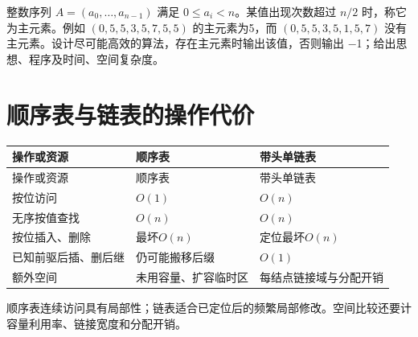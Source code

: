 整数序列 \(A=(a_0,\ldots,a_{n-1})\) 满足 \(0\le a_i<n\)。某值出现次数超过 \(n/2\) 时，称它为主元素。例如 \((0,5,5,3,5,7,5,5)\) 的主元素为5，而 \((0,5,5,3,5,1,5,7)\) 没有主元素。设计尽可能高效的算法，存在主元素时输出该值，否则输出 \ensuremath{-}1；给出思想、程序及时间、空间复杂度。

\section{顺序表与链表的操作代价}\label{DS02-comparison}

\par\smallskip
{\fontsize{9.3}{12}\selectfont\setlength{\tabcolsep}{2.5pt}\setlength{\LTleft}{0pt}\setlength{\LTright}{0pt}
\begin{longtable}{@{}>{\raggedright\arraybackslash}p{}>{\raggedright\arraybackslash}p{}>{\raggedright\arraybackslash}p{}@{}}
\toprule
操作或资源 & 顺序表 & 带头单链表 \\

\midrule\endfirsthead\toprule
操作或资源 & 顺序表 & 带头单链表 \\

\midrule\endhead\bottomrule\endfoot
按位访问 & \(O(1)\) & \(O(n)\) \\

无序按值查找 & \(O(n)\) & \(O(n)\) \\

按位插入、删除 & 最坏\(O(n)\) & 定位最坏\(O(n)\) \\

已知前驱后插、删后继 & 仍可能搬移后缀 & \(O(1)\) \\

额外空间 & 未用容量、扩容临时区 & 每结点链接域与分配开销 \\

\end{longtable}}
\par\smallskip

顺序表连续访问具有局部性；链表适合已定位后的频繁局部修改。空间比较还要计容量利用率、链接宽度和分配开销。
